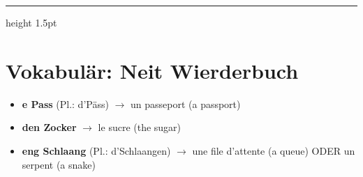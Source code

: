 \vspace{1.5cm}
\color{geminiBlue}\hrule height 1.5pt \vspace{0.5em}\color{black}
\section{Vokabulär: Neit Wierderbuch}

\begin{itemize}
    \item \textbf{e Pass} (Pl.: d'Päss) $\rightarrow$ un passeport (a passport)
    \item \textbf{den Zocker} $\rightarrow$ le sucre (the sugar)
    \item \textbf{eng Schlaang} (Pl.: d'Schlaangen) $\rightarrow$ une file d'attente (a queue) ODER un serpent (a snake)
\end{itemize}

\vspace{1em}

